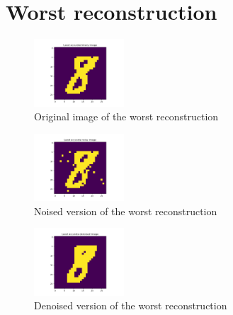 \documentclass[a4paper]{article}
\begin{document}
\section{Worst reconstruction}
\begin{figure}[H]
\centering
\includegraphics[width=0.3\textwidth]{least_accurate_binary_image.png}
\caption{\label{fig:data}Original image of the worst reconstruction}
\end{figure}
\begin{figure}[H]
\centering
\includegraphics[width=0.3\textwidth]{least_accurate_noisy_image.png}
\caption{\label{fig:data}Noised version of the worst reconstruction}
\end{figure}
\begin{figure}[H]
\centering
\includegraphics[width=0.3\textwidth]{least_accurate_denoised_image.png}
\caption{\label{fig:data}Denoised version of the worst reconstruction}
\end{figure}
\end{document}
